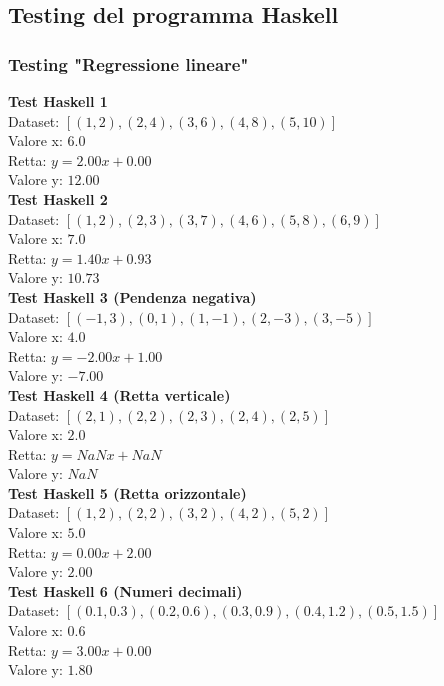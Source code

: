 \documentclass[11pt]{article}
\theoremstyle{definition}
\begin{document}
\subsection{Testing del programma Haskell}
\subsubsection{Testing "Regressione lineare"}
\noindent
\textbf{Test Haskell 1}\\
Dataset: $[(1, 2), (2, 4), (3, 6), (4, 8), (5, 10)]$\\
Valore x: $6.0$\\
Retta: $y = 2.00x + 0.00$\\
Valore y: $12.00$\\
\newline
\textbf{Test Haskell 2}\\
Dataset: $[(1, 2), (2, 3), (3, 7), (4, 6), (5, 8), (6, 9)]$\\
Valore x: $7.0$\\
Retta: $y = 1.40x + 0.93$\\
Valore y: $10.73$\\
\newline
\textbf{Test Haskell 3 (Pendenza negativa)}\\
Dataset: $[(-1, 3), (0, 1), (1, -1), (2, -3), (3, -5)]$\\
Valore x: $4.0$\\
Retta: $y = -2.00x + 1.00$\\
Valore y: $-7.00$\\
\newline
\textbf{Test Haskell 4 (Retta verticale)}\\
Dataset: $[(2, 1), (2, 2), (2, 3), (2, 4), (2, 5)]$\\
Valore x: $2.0$\\
Retta: $y = NaNx + NaN$\\
Valore y: $NaN$\\
\newline
\textbf{Test Haskell 5 (Retta orizzontale)}\\
Dataset: $[(1, 2), (2, 2), (3, 2), (4, 2), (5, 2)]$\\
Valore x: $5.0$\\
Retta: $y = 0.00x + 2.00$\\
Valore y: $2.00$\\
\newline
\textbf{Test Haskell 6 (Numeri decimali)}\\
Dataset: $[(0.1, 0.3), (0.2, 0.6), (0.3, 0.9), (0.4, 1.2), (0.5, 1.5)]$\\
Valore x: $0.6$\\
Retta: $y = 3.00x + 0.00$\\
Valore y: $1.80$
\end{document}
